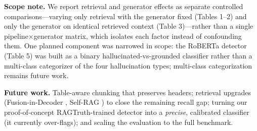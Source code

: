 \documentclass[11pt]{article}
\begin{document}
\textbf{Scope note.} We report retrieval and generator effects as
separate controlled comparisons---varying only retrieval with the
generator fixed (Tables 1--2) and only the generator on identical
retrieved context (Table 3)---rather than a single pipeline×generator
matrix, which isolates each factor instead of confounding them. One
planned component was narrowed in scope: the RoBERTa detector (Table 5)
was built as a binary hallucinated-vs-grounded classifier rather than a
multi-class categorizer of the four hallucination types; multi-class
categorization remains future work.

\textbf{Future work.} Table-aware chunking that preserves headers;
retrieval upgrades (Fusion-in-Decoder \citep{izacard2021fid}, Self-RAG
\citep{asai2024selfrag}) to close the remaining recall gap; turning our
proof-of-concept RAGTruth-trained detector into a \emph{precise},
calibrated classifier (it currently over-flags); and scaling the
evaluation to the full benchmark.




\end{document}
